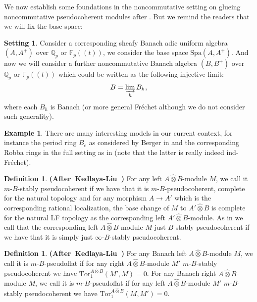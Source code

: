 \documentclass[12pt]{amsart}
\theoremstyle{definition}
\newtheorem{definition}[theorem]{Definition}
\numberwithin{equation}{section}
\newtheorem{example}[theorem]{Example}
\newtheorem{setting}[theorem]{Setting}
\begin{document}
\indent We now establish some foundations in the noncommutative setting on glueing noncommutative pseudocoherent modules after \cite[Chapter 2]{KL2}. But we remind the readers that we will fix the base space:

\begin{setting} \label{setting4.1}
Consider a corresponding sheafy Banach adic uniform algebra $(A,A^+)$ over $\mathbb{Q}_p$ or $\mathbb{F}_p((t))$, we consider the base space $\mathrm{Spa}(A,A^+)$. And now we will consider a further noncommutative Banach algebra $(B,B^+)$ over $\mathbb{Q}_p$ or $\mathbb{F}_p((t))$ which could be written as the following injective limit:
\begin{displaymath}
B=\varinjlim_{h} B_h,	
\end{displaymath}
where each $B_h$ is Banach (or more general Fr\'echet although we do not consider such generality). 	
\end{setting}

\begin{example}
There are many interesting models in our current context, for instance the period ring $B_e$ as considered by Berger in \cite{Ber1} and the corresponding Robba rings in the full setting as in \cite{KL2} (note that the latter is really indeed ind-Fr\'echet).	
\end{example}





\begin{definition} \mbox{\bf{(After Kedlaya-Liu \cite[Definition 2.4.1]{KL2})}}
For any left $A\widehat{\otimes}B$-module $M$, we call it $m$-$B$-stably pseudocoherent if we have that it is $m$-$B$-pseudocoherent, complete for the natural topology and for any morphism $A\rightarrow A'$ which is the corresponding rational localization, the base change of $M$ to $A'\widehat{\otimes} B$ is complete for the natural LF topology as the corresponding left $A'\widehat{\otimes} B$-module.	As in \cite[Definition 2.4.1]{KL2} we call that the corresponding left $A\widehat{\otimes}B$-module $M$ just $B$-stably pseudocoherent if we have that it is simply just $\infty$-$B$-stably pseudocoherent.
\end{definition}
 

\begin{definition}\mbox{\bf{(After Kedlaya-Liu \cite[Definition 2.4.4]{KL2})}}
For any Banach left $A\widehat{\otimes}B$-module $M$, we call it is $m$-$B$-pseudoflat if for any right $A\widehat{\otimes}B$-module $M'$ $m$-$B$-stably pseudocoherent we have $\mathrm{Tor}_1^{A\widehat{\otimes}B}(M',M)=0$. For any Banach right $A\widehat{\otimes}B$-module $M$, we call it is $m$-$B$-pseudoflat if for any left $A\widehat{\otimes}B$-module $M'$ $m$-$B$-stably pseudocoherent we have $\mathrm{Tor}_1^{A\widehat{\otimes}B}(M,M')=0$.
\end{definition}
\end{document}
